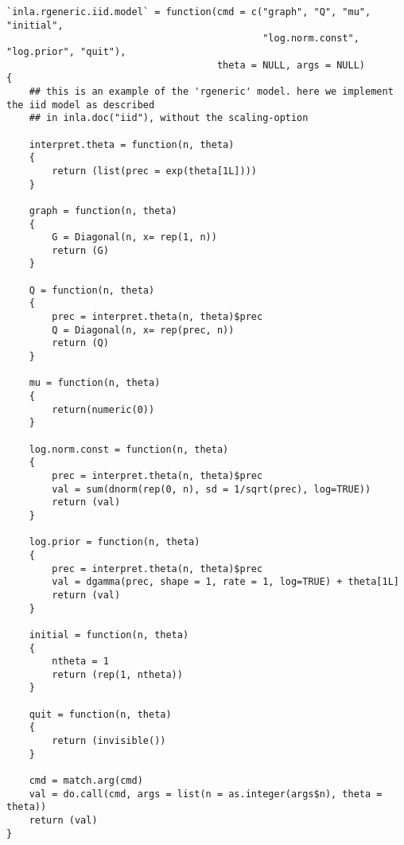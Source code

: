 \documentclass[a4paper,11pt]{article}
\begin{document}
{\small
\begin{verbatim}
`inla.rgeneric.iid.model` = function(cmd = c("graph", "Q", "mu", "initial",
                                             "log.norm.const", "log.prior", "quit"),
                                     theta = NULL, args = NULL)
{
    ## this is an example of the 'rgeneric' model. here we implement the iid model as described
    ## in inla.doc("iid"), without the scaling-option

    interpret.theta = function(n, theta)
    {
        return (list(prec = exp(theta[1L])))
    }

    graph = function(n, theta)
    {
        G = Diagonal(n, x= rep(1, n))
        return (G)
    }

    Q = function(n, theta)
    {
        prec = interpret.theta(n, theta)$prec
        Q = Diagonal(n, x= rep(prec, n))
        return (Q)
    }

    mu = function(n, theta)
    {
        return(numeric(0))
    }

    log.norm.const = function(n, theta)
    {
        prec = interpret.theta(n, theta)$prec
        val = sum(dnorm(rep(0, n), sd = 1/sqrt(prec), log=TRUE))
        return (val)
    }

    log.prior = function(n, theta)
    {
        prec = interpret.theta(n, theta)$prec
        val = dgamma(prec, shape = 1, rate = 1, log=TRUE) + theta[1L]
        return (val)
    }

    initial = function(n, theta)
    {
        ntheta = 1
        return (rep(1, ntheta))
    }

    quit = function(n, theta)
    {
        return (invisible())
    }

    cmd = match.arg(cmd)
    val = do.call(cmd, args = list(n = as.integer(args$n), theta = theta))
    return (val)
}
\end{verbatim}
}
\end{document}
